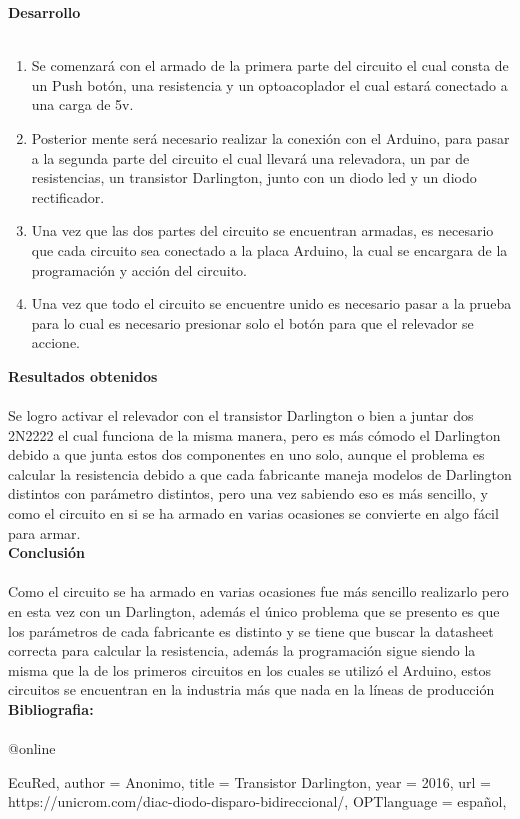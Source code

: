 \documentclass[12pt]{report}
\begin{document}
{\huge \textbf{Desarrollo}\\}\\
{\large \begin{enumerate}
\item Se comenzará con el armado de la primera parte del circuito el cual consta de un Push botón, una resistencia y un optoacoplador el cual estará conectado a una carga de 5v.
\item Posterior mente será necesario realizar la conexión con el Arduino, para pasar a la segunda parte del circuito el cual llevará una relevadora, un par de resistencias, un transistor Darlington, junto con un diodo led y un diodo rectificador.
\item Una vez que las dos partes del circuito se encuentran armadas, es necesario que cada circuito sea conectado a la placa Arduino, la cual se encargara de la programación y acción del circuito.
\item Una vez que todo el circuito se encuentre unido es necesario pasar a la prueba para lo cual es necesario presionar solo el botón para que el relevador se accione.

\end{enumerate}}

{\huge \textbf{Resultados obtenidos}\\}\\
{\large Se  logro activar el relevador con el transistor Darlington o bien a juntar dos 2N2222 el cual funciona de la misma manera, pero es más cómodo el Darlington debido a que junta estos dos componentes en uno solo, aunque el problema es calcular la resistencia debido a que cada fabricante maneja modelos de Darlington distintos con parámetro  distintos, pero una vez sabiendo eso es más sencillo, y como el circuito en si se ha armado en varias ocasiones se convierte en algo fácil para armar.}\\


{\huge \textbf{Conclusión}\\}\\
{\large Como  el circuito se ha armado en varias ocasiones fue más sencillo realizarlo pero en esta vez con un Darlington, además el único problema que se presento es que los parámetros de cada fabricante es distinto y se tiene que buscar la datasheet correcta para calcular la resistencia, además la programación sigue siendo la misma que la de los primeros circuitos en los cuales se utilizó el Arduino, estos circuitos se encuentran en la industria más que nada en la líneas de producción}
\newpage
{\huge \textbf{Bibliografia:}\\}\\

@online{EcuRed,
author = {Anonimo},
title = {Transistor Darlington},
year = {2016},
url = {https://unicrom.com/diac-diodo-disparo-bidireccional/},
OPTlanguage = {español},

}
\end{document}
